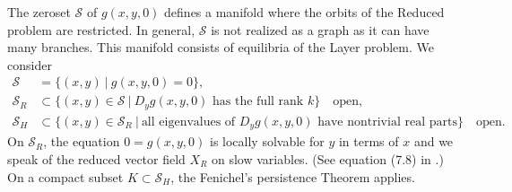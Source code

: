 \documentclass[usletter,11pt]{article}
\def\blue{\color{blue}}
\theoremstyle{remark}
\begin{document}
The zeroset $\mathcal{S}$ of $g(x,y,0)$ defines a manifold where the orbits of the Reduced problem are restricted. In general, $\mathcal{S}$ is not realized as a graph as it can have many branches. This manifold consists of equilibria of the Layer problem. We consider 
\begin{align*}
 \mathcal{S}& = \Big\{ (x,y)\:\Big|\: g(x,y,0)=0\Big\},\\
 \mathcal{S}_R&\subset \Big\{ (x,y)\in \mathcal{S} \:\Big|\: \text{$D_y g(x,y,0)$ has the full rank $k$}\Big\} \quad \text{open},\\
 \mathcal{S}_H&\subset \Big\{ (x,y)\in \mathcal{S}_R \:\Big|\: \text{all eigenvalues of $D_y g(x,y,0)$ have nontrivial real parts}\Big\}\quad \text{open}. 
\end{align*}
On $\mathcal{S}_R$, the equation $0=g(x,y,0)$ is {\blue locally solvable for $y$ in terms of $x$} and we speak of the reduced vector field $X_R$ on slow variables. (See equation (7.8) in \cite{fenichel_geometric_1979}.) On a compact subset $K \subset \mathcal{S}_H$, the Fenichel's persistence Theorem \cite[Theorem 9.1]{fenichel_geometric_1979} applies. 








\end{document}
